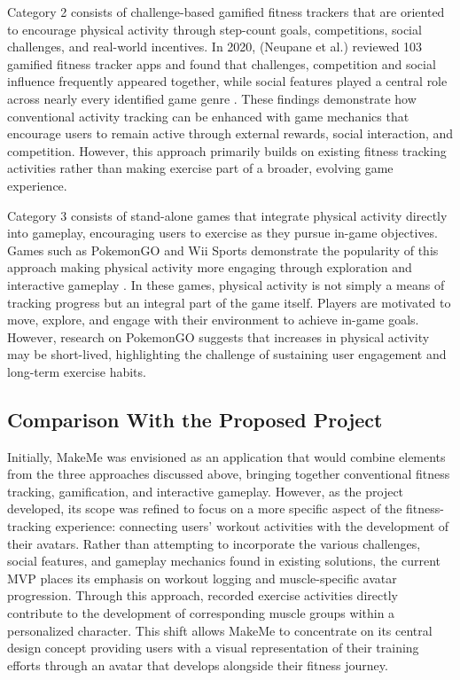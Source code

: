 \documentclass[11pt]{article}
\begin{document}
Category 2 consists of challenge-based gamified fitness trackers that are oriented to encourage physical
activity through step-count goals, competitions, social challenges, and real-world incentives. In 2020, (Neupane et al.)
reviewed 103 gamified fitness tracker apps and found that challenges, competition and social influence frequently
appeared together, while social features played a central role across nearly every identified game genre \cite{neupane2020review}.
These findings demonstrate how conventional activity tracking can be enhanced with game mechanics that encourage
users to remain active through external rewards, social interaction, and competition. However, this approach primarily
builds on existing fitness tracking activities rather than making exercise part of a broader, evolving game experience.

Category 3 consists of stand-alone games that integrate physical activity directly into gameplay, encouraging
users to exercise as they pursue in-game objectives. Games such as PokemonGO and Wii Sports demonstrate the popularity
of this approach making physical activity more engaging through exploration and interactive gameplay \cite{koh2026motivational, yim2007using}.
In these games, physical activity is not simply a means of tracking progress but an integral part of the game itself. Players are motivated to move, explore, and engage with their environment to achieve in-game goals.
However, research on PokemonGO suggests that increases in physical activity may be short-lived, highlighting the challenge
of sustaining user engagement and long-term exercise habits.

\subsection{Comparison With the Proposed Project}
Initially, MakeMe was envisioned as an application that would combine elements from the three
approaches discussed above, bringing together conventional fitness tracking, gamification,
and interactive gameplay. However, as the project developed, its scope was refined to focus
on a more specific aspect of the fitness-tracking experience: connecting users' workout
activities with the development of their avatars. Rather than attempting to incorporate
the various challenges, social features, and gameplay mechanics found in existing solutions,
the current MVP places its emphasis on workout logging and muscle-specific avatar progression.
Through this approach, recorded exercise activities directly contribute to the development of
corresponding muscle groups within a personalized character. This shift allows MakeMe to
concentrate on its central design concept providing users with a visual representation of
their training efforts through an avatar that develops alongside their fitness journey.
\end{document}
